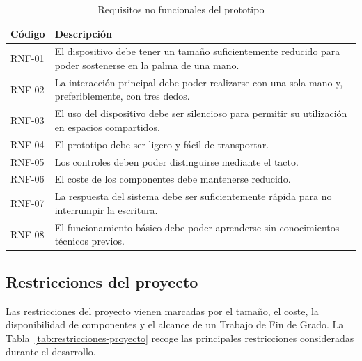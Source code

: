 \begin{table}[H]
    \centering
    \caption{Requisitos no funcionales del prototipo}
    \label{tab:requisitos-no-funcionales}
    \begin{tabularx}{\textwidth}{@{}p{}X@{}}
        \toprule
        \textbf{Código} & \textbf{Descripción} \\
        \midrule
        RNF-01 & El dispositivo debe tener un tamaño suficientemente reducido para poder sostenerse en la palma de una mano. \\
        RNF-02 & La interacción principal debe poder realizarse con una sola mano y, preferiblemente, con tres dedos. \\
        RNF-03 & El uso del dispositivo debe ser silencioso para permitir su utilización en espacios compartidos. \\
        RNF-04 & El prototipo debe ser ligero y fácil de transportar. \\
        RNF-05 & Los controles deben poder distinguirse mediante el tacto. \\
        RNF-06 & El coste de los componentes debe mantenerse reducido. \\
        RNF-07 & La respuesta del sistema debe ser suficientemente rápida para no interrumpir la escritura. \\
        RNF-08 & El funcionamiento básico debe poder aprenderse sin conocimientos técnicos previos. \\
        \bottomrule
    \end{tabularx}
\end{table}

\subsection{Restricciones del proyecto}
\label{subsec:restricciones-nuevo}

Las restricciones del proyecto vienen marcadas por el tamaño, el coste, la disponibilidad de componentes y el alcance de un Trabajo de Fin de Grado. La Tabla~\ref{tab:restricciones-proyecto} recoge las principales restricciones consideradas durante el desarrollo.

